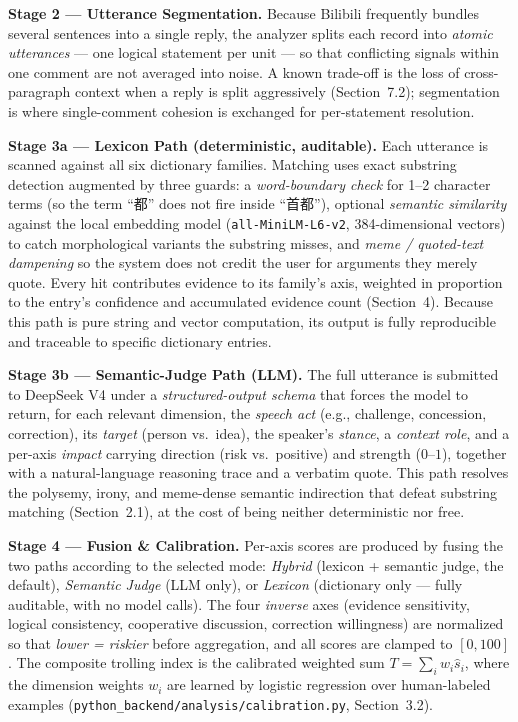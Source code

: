 \documentclass[11pt,a4paper]{article}
\begin{document}
\textbf{Stage 2 --- Utterance Segmentation.} Because Bilibili frequently bundles several
sentences into a single reply, the analyzer splits each record into \emph{atomic utterances}
--- one logical statement per unit --- so that conflicting signals within one comment are not
averaged into noise. A known trade-off is the loss of cross-paragraph context when a reply is
split aggressively (Section~7.2); segmentation is where single-comment cohesion is exchanged
for per-statement resolution.

\textbf{Stage 3a --- Lexicon Path (deterministic, auditable).} Each utterance is scanned
against all six dictionary families. Matching uses exact substring detection augmented by
three guards: a \emph{word-boundary check} for 1--2 character terms (so the term ``都'' does
not fire inside ``首都''), optional \emph{semantic similarity} against the local embedding
model (\texttt{all-MiniLM-L6-v2}, 384-dimensional vectors) to catch morphological variants
the substring misses, and \emph{meme / quoted-text dampening} so the system does not credit
the user for arguments they merely quote. Every hit contributes evidence to its family's
axis, weighted in proportion to the entry's confidence and accumulated evidence count
(Section~4). Because this path is pure string and vector computation, its output is fully
reproducible and traceable to specific dictionary entries.

\textbf{Stage 3b --- Semantic-Judge Path (LLM).} The full utterance is submitted to DeepSeek
V4 under a \emph{structured-output schema} that forces the model to return, for each relevant
dimension, the \emph{speech act} (e.g., challenge, concession, correction), its \emph{target}
(person vs.\ idea), the speaker's \emph{stance}, a \emph{context role}, and a per-axis
\emph{impact} carrying direction (risk vs.\ positive) and strength ($0$--$1$), together with
a natural-language reasoning trace and a verbatim quote. This path resolves the polysemy,
irony, and meme-dense semantic indirection that defeat substring matching (Section~2.1), at
the cost of being neither deterministic nor free.

\textbf{Stage 4 --- Fusion \& Calibration.} Per-axis scores are produced by fusing the two
paths according to the selected mode: \emph{Hybrid} (lexicon + semantic judge, the default),
\emph{Semantic Judge} (LLM only), or \emph{Lexicon} (dictionary only --- fully auditable, with
no model calls). The four \emph{inverse} axes (evidence sensitivity, logical consistency,
cooperative discussion, correction willingness) are normalized so that \emph{lower = riskier}
before aggregation, and all scores are clamped to $[0, 100]$. The composite trolling index is
the calibrated weighted sum $T = \sum_i w_i \hat{s}_i$, where the dimension weights $w_i$ are
learned by logistic regression over human-labeled examples
(\texttt{python\_backend/analysis/calibration.py}, Section~3.2).
\end{document}
